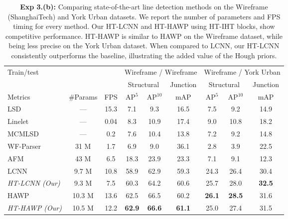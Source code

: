 \documentclass[runningheads]{llncs}
\begin{document}
\begin{table}[t!]
    \centering
        \begin{tabular}{p{8.2em} c@{\hskip 0.1in}ccc cccc }
        \toprule
        Train\slash test & & & \multicolumn{3}{c}{Wireframe / Wireframe} & 
        \multicolumn{3}{c}{Wireframe / York Urban}\\ \cmidrule(l){4-6}\cmidrule(l){7-9}
        & & & \multicolumn{2}{c}{Structural} & \multicolumn{1}{c}{Junction} &  \multicolumn{2}{c}{Structural} & \multicolumn{1}{c}{Junction} \\ \cmidrule(l){4-5}\cmidrule(l){6-6} \cmidrule(l){7-8} \cmidrule(l){9-9}
        Metrics & \#Params & FPS & AP$^5$ & AP$^{10}$ & mAP & AP$^5$ & AP$^{10}$ & mAP \\  \midrule
        LSD \cite{von2008lsd}       & --- & 15.3  & 7.1  & 9.3  & 16.5  & 7.5  & 9.2  & 14.9  \\
        Linelet \cite{cho2017novel}  & --- & 0.04 & 8.3  & 10.9 & 17.4 & 9.0  & 10.8 & 18.2 \\
        MCMLSD \cite{almazan2017mcmlsd} & ---& 0.2 & 7.6  & 10.4 & 13.8 & 7.2  & 9.2  & 14.8  \\
        WF-Parser \cite{huang2018learning} & 31 M & 1.7 & 6.9 & 9.0 & 36.1 & 2.8 & 3.9  & 22.5\\
        AFM \cite{xue2019learning} & 43 M & 6.5 & 18.3 & 23.9 & 23.3 & 7.1 & 9.1 & 12.3\\
        LCNN \cite{zhou2019end} & 9.7 M &10.8  & 58.9 & 62.9 & 59.3 & 24.3 & 26.4 & 30.4 \\
        \emph{HT-LCNN (Our)} & 9.3 M & 7.5 & 60.3 & 64.2 & 60.6 & 25.7 & 28.0 & \textbf{32.5}\\
        HAWP \cite{xue2020holistically}  & 10.3 M & 13.6 & 62.5 & 66.5 & 60.2 & \textbf{26.1} & \textbf{28.5} & 31.6\\
        \emph{HT-HAWP (Our)} & 10.5 M &12.2 & \textbf{62.9} & \textbf{66.6} & \textbf{61.1} & 25.0 & 27.4 & 31.5\\
        \bottomrule
        \end{tabular} 
    \caption{\textbf{Exp 3.(b):} 
    Comparing state-of-the-art line detection methods on the Wireframe (ShanghaiTech) and York Urban datasets.
    We report the number of parameters and FPS timing for every method. 
    Our HT-LCNN and HT-HAWP using HT-IHT blocks, show competitive performance. 
    HT-HAWP is similar to HAWP on the Wireframe dataset, while being less precise on the York Urban dataset. When compared to LCNN, our HT-LCNN consistently outperforms the baseline, illustrating the added value of the Hough priors. 
    }
    \label{tab:exp3_b}
\end{table}
\end{document}
